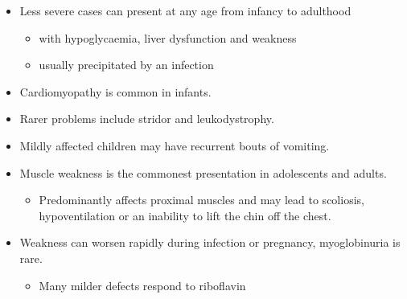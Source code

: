 \documentclass{scrartcl}
\begin{document}
\begin{itemize}
\item Less severe cases can present at any age from infancy to adulthood
\begin{itemize}
\item with hypoglycaemia, liver dysfunction and weakness
\item usually precipitated by an infection
\end{itemize}
\item Cardiomyopathy is common in infants.
\item Rarer problems include stridor and leukodystrophy.
\item Mildly affected children may have recurrent bouts of vomiting.
\item Muscle weakness is the commonest presentation in adolescents and adults.
\begin{itemize}
\item Predominantly affects proximal muscles and may lead to scoliosis,
hypoventilation or an inability to lift the chin off the chest.
\end{itemize}
\item Weakness can worsen rapidly during infection or pregnancy, myoglobinuria is rare.
\begin{itemize}
\item Many milder defects respond to riboflavin
\end{itemize}
\end{itemize}
\end{document}
